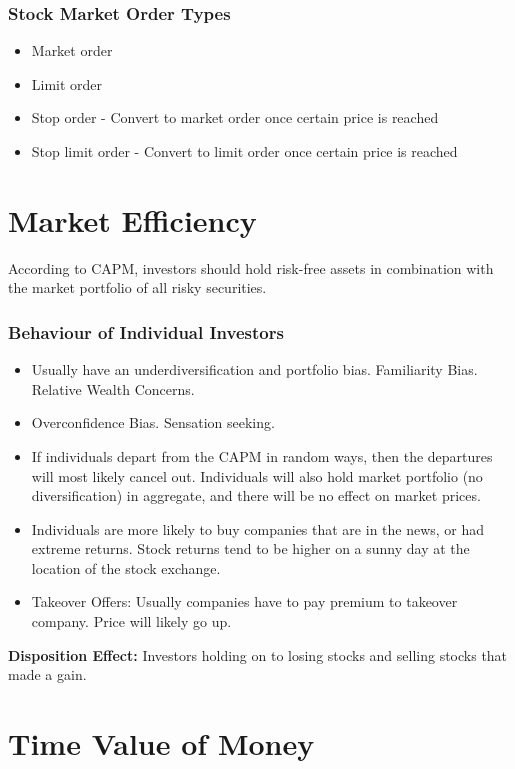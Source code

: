 \documentclass[english, 12pt]{article}
\begin{document}
\subsubsection*{Stock Market Order Types}
\begin{itemize}
\item Market order
\item Limit order
\item Stop order - Convert to market order once certain price is reached
\item Stop limit order - Convert to limit order once certain price is reached
\end{itemize}

\section{Market Efficiency}
According to CAPM, investors should hold risk-free assets in combination with the market portfolio of all risky securities.
\subsubsection*{Behaviour of Individual Investors}
\begin{itemize}
\item Usually have an underdiversification and portfolio bias. Familiarity Bias. Relative Wealth Concerns.
\item Overconfidence Bias. Sensation seeking.
\item If individuals depart from the CAPM in random ways, then the departures will most likely cancel out. Individuals will also hold market portfolio (no diversification) in aggregate, and there will be no effect on market prices.
\item Individuals are more likely to buy companies that are in the news, or had extreme returns. Stock returns tend to be higher on a sunny day at the location of the stock exchange.
\item Takeover Offers: Usually companies have to pay premium to takeover company. Price will likely go up.
\end{itemize}
\begin{defn}
\textbf{Disposition Effect:} Investors holding on to losing stocks and selling stocks that made a gain.
\end{defn}

\section{Time Value of Money}
\end{document}
